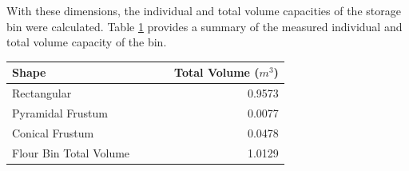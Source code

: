 With these dimensions, the individual and total volume capacities of the storage bin were calculated. Table \ref{ch4:tab:volume-calculation} provides a summary of the measured individual and total volume capacity of the bin. \\


\begin{table}[H]
	\centering
	\label{ch4:tab:volume-calculation}
	\begin{tabularx}{0.69\textwidth}{l c c c r}
		\toprule
		\textbf{Shape}         & {} & {} & {} & \textbf{Total Volume ($m^{3}$)} \\ \midrule

		Rectangular            & {} & {} & {} & 0.9573                          \\

		Pyramidal Frustum      & {} & {} & {} & 0.0077                          \\

		Conical Frustum        & {} & {} & {} & 0.0478                          \\ \midrule

		Flour Bin Total Volume & {} & {} & {} & 1.0129                          \\ \bottomrule
	\end{tabularx}
\end{table}




